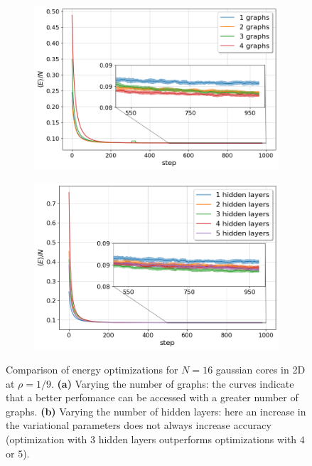\documentclass[a4paper, 12pt, oneside]{article}
\begin{document}
\begin{figure}[H]
    \begin{subfigure}{0.5\textwidth}
        \centering
        \includegraphics[width = 1.0\textwidth]{figures/energy_against_graphs.png}
            \caption{\label{fig:fig_energy_vs_graphs}}
    \end{subfigure}
    \begin{subfigure}{0.5\textwidth}
        \centering
        \includegraphics[width = 1.0\textwidth]{figures/energy_against_lyrs.png}
            \caption{\label{fig:fig_energy_vs_layers}}
    \end{subfigure}
    \caption{Comparison of energy optimizations for $N=16$ gaussian cores in 2D at $\rho=1/9$. \textbf{(a)} 
    Varying the number of graphs: the curves indicate that a better perfomance can be accessed with a greater number of graphs. 
    \textbf{(b)} Varying the number of hidden layers: here an increase in the variational parameters does not always increase accuracy 
    (optimization with $3$ hidden layers outperforms optimizations with $4$ or $5$).}
\end{figure}
\end{document}
